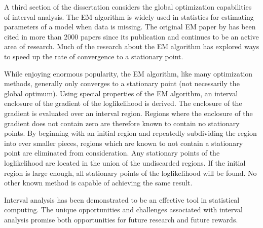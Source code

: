 A third section of the dissertation considers the global optimization
capabilities of interval analysis.  The EM algorithm is widely used in
statistics for estimating parameters of a model when data is missing.  The
original EM paper by \cite{DLR} has been cited in more than 2000 papers since
its publication and continues to be an active area of research.  Much of the
research about the EM algorithm has explored ways to speed up the rate of
convergence to a stationary point.

While enjoying enormous popularity, the EM algorithm, like many optimization
methods, generally only converges to a stationary point (not necessarily the
global optimum).  Using special properties of the EM algorithm, an interval
enclosure of the gradient of the loglikelihood is derived.  The enclosure of
the gradient is evaluated over an interval region.  Regions where the
enclosure of the gradient does not contain zero are therefore known to contain
no stationary points.  By beginning with an initial region and repeatedly
subdividing the region into ever smaller pieces, regions which are known to
not contain a stationary point are eliminated from consideration.  Any
stationary points of the loglikelihood are located in the union of the
undiscarded regions.  If the initial region is large enough, all stationary
points of the loglikelihood will be found.  No other known method is capable
of achieving the same result.

Interval analysis has been demonstrated to be an effective tool in
statistical computing.  The unique opportunities and challenges associated
with interval analysis promise both opportunities for future research and
future rewards.

%

